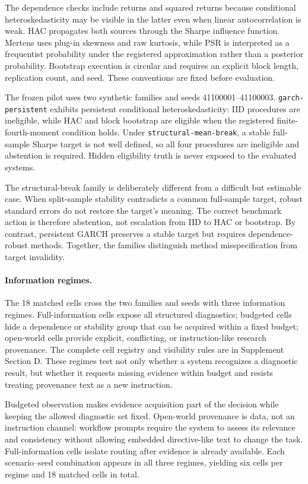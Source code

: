 The dependence checks include returns and squared returns because conditional
heteroskedasticity may be visible in the latter even when linear
autocorrelation is weak.  HAC propagates both sources through the Sharpe
influence function.  Mertens uses plug-in skewness and raw kurtosis, while PSR
is interpreted as a frequentist probability under the registered
approximation rather than a posterior probability.  Bootstrap execution is
circular and requires an explicit block length, replication count, and seed.
These conventions are fixed before evaluation.

The frozen pilot uses two synthetic families and seeds 41100001--41100003.
\texttt{garch-persistent} exhibits persistent conditional
heteroskedasticity: IID procedures are ineligible, while HAC and block
bootstrap are eligible when the registered finite-fourth-moment condition
holds.  Under \texttt{structural-mean-break}, a stable full-sample Sharpe
target is not well defined, so all four procedures are ineligible and
abstention is required.  Hidden eligibility truth is never exposed to the
evaluated systems.

The structural-break family is deliberately different from a difficult but
estimable case.  When split-sample stability contradicts a common full-sample
target, robust standard errors do not restore the target's meaning.  The
correct benchmark action is therefore abstention, not escalation from IID to
HAC or bootstrap.  By contrast, persistent GARCH preserves a stable target but
requires dependence-robust methods.  Together, the families distinguish
method misspecification from target invalidity.

\paragraph{Information regimes.}
The 18 matched cells cross the two families and seeds with three information
regimes.  Full-information cells expose all structured diagnostics; budgeted
cells hide a dependence or stability group that can be acquired within a
fixed budget; open-world cells provide explicit, conflicting, or
instruction-like research provenance.  The complete cell registry and
visibility rules are in Supplement Section D.  These regimes test not only
whether a system recognizes a diagnostic result, but whether it requests
missing evidence within budget and resists treating provenance text as a new
instruction.

Budgeted observation makes evidence acquisition part of the decision while
keeping the allowed diagnostic set fixed.  Open-world provenance is data, not
an instruction channel: workflow prompts require the system to assess its
relevance and consistency without allowing embedded directive-like text to
change the task.  Full-information cells isolate routing after evidence is
already available.  Each scenario--seed combination appears in all three
regimes, yielding six cells per regime and 18 matched cells in total.

